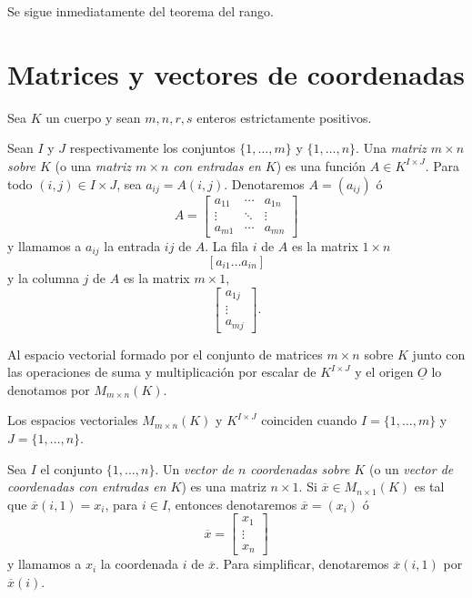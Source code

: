 \dem Se sigue inmediatamente del teorema del rango.

\section{Matrices y vectores de coordenadas}

Sea $K$ un cuerpo y sean $m,n,r,s$ enteros estrictamente positivos.

\begin{defn}
Sean $I$ y $J$ respectivamente los conjuntos $\{1,\ldots,m\}$ y $\{1,\ldots,n\}$. Una \emph{matriz $m\times n$ sobre $K$} (o una \emph{matriz $m\times n$ con entradas en $K$}) es una funci\'on $A\in K^{I\times J}$. Para todo $(i,j)\in I\times J$, sea $a_{ij}=A(i,j)$. Denotaremos $A=(a_{ij})$ \'o
$$ A=\left[\begin{array}{ccc}
a_{11} & \cdots & a_{1n}\\
\vdots & \ddots & \vdots\\
a_{m1} & \cdots & a_{mn}
\end{array}\right]$$
y llamamos a $a_{ij}$ la entrada $ij$ de $A$. La fila $i$ de $A$ es la matrix $1\times n$
$$\left[a_{i1}\ldots a_{in}\right]$$
y la columna $j$ de $A$ es la matrix $m\times 1$,
$$ \left[\begin{array}{c}
a_{1j}\\
\vdots\\
a_{mj}
\end{array}\right].$$

Al espacio vectorial formado por el conjunto de matrices $m\times n$ sobre $K$ junto con las operaciones de suma y multiplicaci\'on por escalar de $K^{I\times J}$ y el origen $\underline{O}$ lo denotamos por $M_{m\times n}(K)$.
\end{defn}

\begin{obs}
Los espacios vectoriales $M_{m\times n}(K)$  y $K^{I\times J}$ coinciden cuando $I=\{1,\ldots,m\}$ y $J=\{1,\ldots,n\}$.
\end{obs}

\begin{defn}
Sea $I$ el conjunto $\{1,\ldots,n\}$. Un \emph{vector de $n$ coordenadas sobre $K$}  (o un \emph{vector de coordenadas con entradas en $K$}) es una matriz $n\times 1$. Si $\overline{x}\in M_{n\times 1}(K)$ es tal que $\overline{x}(i,1)=x_i$, para $i\in I$, entonces denotaremos $\overline{x}=(x_i)$ \'o
$$ \overline{x}=\left[\begin{array}{c}
x_{1}\\
\vdots\\
x_{n}
\end{array}\right]$$
y llamamos a $x_i$ la coordenada $i$ de $\overline{x}$. Para simplificar, denotaremos $\overline{x}(i,1)$ por $\overline{x}(i)$.
\end{defn}

